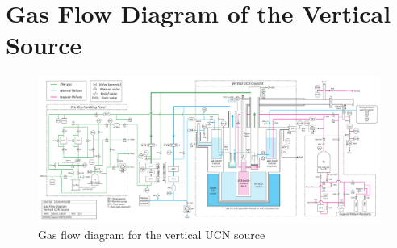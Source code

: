 \chapter{Gas Flow Diagram of the Vertical Source}
\begin{figure}[h]
  \centering
    \includegraphics[width=1.55\textwidth, angle = 270]{gasflow.pdf}
    \caption{ Gas flow diagram for the vertical UCN source }
    \label{fig:gasflow}
\end{figure}